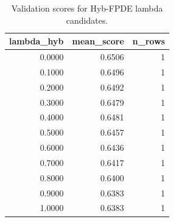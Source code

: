 \begin{table}[t]
\caption{Validation scores for Hyb-FPDE lambda candidates.}
\label{tab:lambda_distribution_computed}
\centering
\begin{tabular}{rrr}
\toprule
lambda\_hyb & mean\_score & n\_rows \\
\midrule
0.0000 & 0.6506 & 1 \\
0.1000 & 0.6496 & 1 \\
0.2000 & 0.6492 & 1 \\
0.3000 & 0.6479 & 1 \\
0.4000 & 0.6481 & 1 \\
0.5000 & 0.6457 & 1 \\
0.6000 & 0.6436 & 1 \\
0.7000 & 0.6417 & 1 \\
0.8000 & 0.6400 & 1 \\
0.9000 & 0.6383 & 1 \\
1.0000 & 0.6383 & 1 \\
\bottomrule
\end{tabular}

\end{table}
